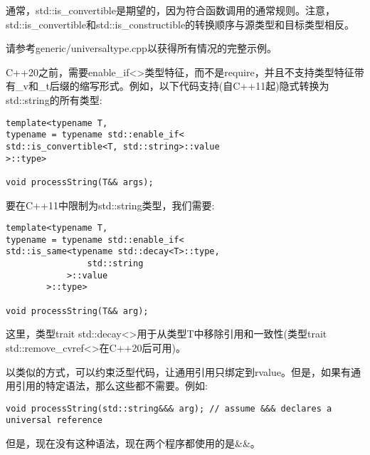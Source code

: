 通常，std::is\_convertible是期望的，因为符合函数调用的通常规则。注意，std::is\_convertible和std::is\_constructible的转换顺序与源类型和目标类型相反。\par

请参考generic/universaltype.cpp以获得所有情况的完整示例。\par

C++20之前，需要enable\_if<>类型特征，而不是require，并且不支持类型特征带有\_v和\_t后缀的缩写形式。例如，以下代码支持(自C++11起)隐式转换为std::string的所有类型:\par

\begin{lstlisting}[caption={}]
template<typename T,
typename = typename std::enable_if<
std::is_convertible<T, std::string>::value
>::type>

void processString(T&& args);
\end{lstlisting}

要在C++11中限制为std::string类型，我们需要:\par

\begin{lstlisting}[caption={}]
template<typename T,
typename = typename std::enable_if<
std::is_same<typename std::decay<T>::type,
				std::string
			>::value
		>::type>

void processString(T&& arg);
\end{lstlisting}

这里，类型trait std::decay<>用于从类型T中移除引用和一致性(类型trait std::remove\_cvref<>在C++20后可用)。\par

以类似的方式，可以约束泛型代码，让通用引用只绑定到rvalue。但是，如果有通用引用的特定语法，那么这些都不需要。例如:\par

\begin{lstlisting}[caption={}]
void processString(std::string&&& arg); // assume &&& declares a universal reference
\end{lstlisting}

但是，现在没有这种语法，现在两个程序都使用的是\&\&。\par




























